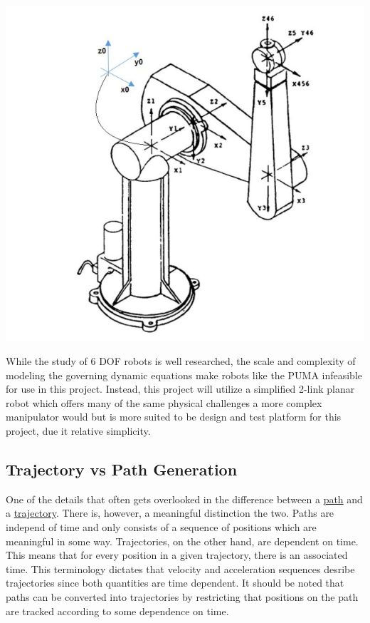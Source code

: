 \documentclass[journal]{IEEEtran}
\begin{document}
\includegraphics[scale=.5]{../images/puma}

While the study of 6 DOF robots is well researched, the scale and complexity of modeling the governing dynamic equations make robots like the PUMA infeasible for use in this project. Instead, this project will utilize a simplified 2-link planar robot which offers many of the same physical challenges a more complex manipulator would but is more suited to be design and test platform for this project, due it relative simplicity.

\subsection{Trajectory vs Path Generation}

One of the details that often gets overlooked in the difference between a \underline{path} and a \underline{trajectory}. There is, however, a meaningful distinction the two. Paths are independ of time and only consists of a sequence of positions which are meaningful in some way. Trajectories, on the other hand, are dependent on time. This means that for every position in a given trajectory, there is an associated time. This terminology dictates that velocity and acceleration sequences desribe trajectories since both quantities are time dependent. It should be noted that paths can be converted into trajectories by restricting that positions on the path are tracked according to some dependence on time. \\
\end{document}
